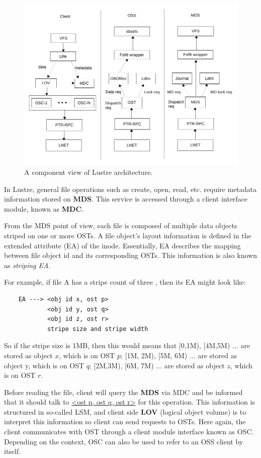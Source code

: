 \begin{figure}[htb]
\centering
\includegraphics[width=4.5in]{img/lustre_components}
\caption{A component view of Lustre architecture.}
\label{fig:lustre_components}     
\end{figure}
 
In Lustre, general file operations such as create, open, read, etc. require
metadata information stored on \textbf{MDS}. This service is accessed through
a client interface module, known as \textbf{MDC}.

From the MDS point of view, each file is composed of multiple data objects striped
on one or more OSTs. A file object's layout information is defined in the
extended attribute (EA) of the inode. Essentially, EA describes the mapping
between file object id and its corresponding OSTs. This information is also
known as \textit{striping EA}.

For example, if file A has a stripe count of three , then its EA might look like:

\begin{Verbatim}
    EA ---> <obj id x, ost p>
            <obj id y, ost q>
            <obj id z, ost r>
            stripe size and stripe width
\end{Verbatim}

So if the stripe size is 1MB, then this would means that [0,1M), [4M,5M) ... are
stored as object $x$, which is on OST $p$; [1M, 2M), [5M, 6M) ... are stored as
object y, which is on OST $q$; [2M,3M), [6M, 7M) ... are stored as object $z$,
which is on OST $r$.

Before reading the file, client will query the \textbf{MDS} via MDC and be
informed that it should talk to \url{<ost p, ost q, ost r>} for this
operation.  This information is structured in so-called LSM, and client side
\textbf{LOV} (logical object volume) is to interpret this information so
client can send requests to OSTs.  Here again, the client communicates with OST
through a client module interface known as OSC. Depending on the context, OSC
can also be used to refer to an OSS client by itself.

